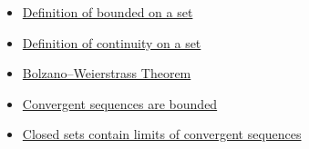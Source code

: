\begin{dependencies}
\begin{itemize}
  \item \hyperref[def:bounded-on-a-set]{Definition of bounded on a set}
  \item \hyperref[def:continuity-on-a-set]{Definition of continuity on a set}
  \item \hyperref[thm:bolzano-weierstrass-sequences]{Bolzano--Weierstrass Theorem}
  \item \hyperref[thm:convergent-implies-bounded]{Convergent sequences are bounded}
  \item \hyperref[prop:closed-sets-contain-limits]{Closed sets contain limits of convergent sequences}
\end{itemize}
\end{dependencies}

\clearpage
